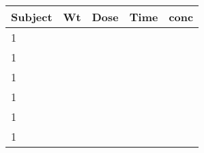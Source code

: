 \documentclass{article}
\begin{document}
 \thispagestyle{empty}
 \pagestyle{empty}
 \begin{table}[H]
  \begin{center}
   \begin{tabular}{lrrrr}
     \hline \hline
    Subject & Wt & Dose & Time & conc \\ \hline
    1 & \verb#79.6# & \verb#4.02# & \verb#0.00# & \verb#0.74# \\
    1 & \verb#79.6# & \verb#4.02# & \verb#0.25# & \verb#2.84# \\
    1 & \verb#79.6# & \verb#4.02# & \verb#0.57# & \verb#6.57# \\
    1 & \verb#79.6# & \verb#4.02# & \verb#1.12# & \verb#10.50# \\
    1 & \verb#79.6# & \verb#4.02# & \verb#2.02# & \verb#9.66# \\
    1 & \verb#79.6# & \verb#4.02# & \verb#3.82# & \verb#8.58# \\ \hline
   \end{tabular}
  \end{center}
 \end{table}
\end{document}
